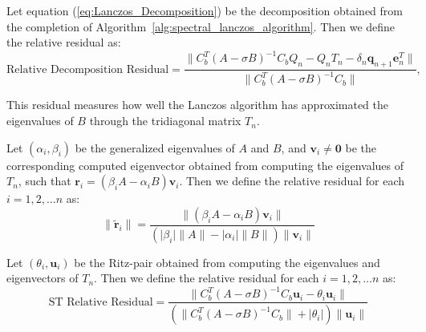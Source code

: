 \begin{definition}\label{def:DecompositionResidual}
	Let equation (\ref{eq:Lanczos_Decomposition}) be the decomposition obtained from the completion of Algorithm~\ref{alg:spectral_lanczos_algorithm}. Then we define the relative residual as:
	\begin{equation}\label{eq:DecompositionResidual}
		\text{Relative Decomposition Residual} = \frac{\|C_b^T (A-\sigma B)^{-1} C_bQ_n - Q_nT_n - \delta_{n}\mathbf{q}_{n+1}\mathbf{e}_n^T\|}{\|C_b^T (A-\sigma B)^{-1} C_b\|},
	\end{equation}
\end{definition}
This residual measures how well the Lanczos algorithm has approximated the eigenvalues of $B$ through the tridiagonal matrix $T_n$.

\begin{definition}\label{def:GeneralizedRelativeResidual}
	Let $(\alpha_i, \beta_i)$ be the generalized eigenvalues of $A$ and $B$, and $\mathbf{v}_i \neq \mathbf{0}$ be the corresponding computed eigenvector obtained from computing the eigenvalues of $T_n$, such that $\mathbf{r}_i = (\beta_i A - \alpha_i B)\mathbf{v}_i$. Then we define the relative residual for each $i = 1, 2, \ldots n$ as:
	\begin{equation}\label{eq:GeneralizedResidual}
		\|\tilde{\mathbf{r}}_i\| = \frac{\| (\beta_i A - \alpha_i B)\mathbf{v}_i \| }{(\lvert \beta_i \rvert \|A\| - \lvert \alpha_i \rvert \|B\|)\|\mathbf{v}_i\| }
	\end{equation}
\end{definition}

\begin{definition}
\label{def:SpectralTransformedResidual}
	Let $(\theta_i, \mathbf{u}_i)$ be the Ritz-pair obtained from computing the eigenvalues and eigenvectors of $T_n$. Then we define the relative residual for each $i = 1, 2, \ldots n$ as:
	\begin{equation}\label{eq:STResidual}
		\text{ST Relative Residual} = \frac{\| C_b^T(A - \sigma B)^{-1}C_b \mathbf{u}_i - \theta_i \mathbf{u}_i \| }{( \| C_b^T(A - \sigma B)^{-1}C_b \| + \lvert \theta_i \rvert)\|\mathbf{u}_i\| }
	\end{equation}
\end{definition}

